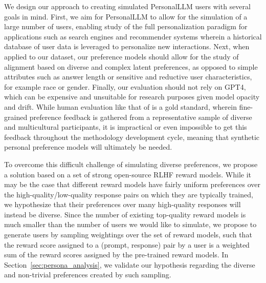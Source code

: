We design our approach to creating simulated \textsf{PersonalLLM} users with several goals in mind.
First, we aim for \textsf{PersonalLLM} to allow for the simulation of a large number of users, enabling study of the full personalization paradigm for applications such as search engines and recommender systems \citep{davidson2010youtube, das2007google, Xu_2022, F_rber_2020} wherein a historical database of user data is leveraged to personalize new interactions.
Next, when applied to our dataset, our preference models should allow for the study of alignment based on diverse and complex latent preferences, as opposed to simple attributes such as answer length or sensitive and reductive user characteristics, for example race or gender.
Finally, our evaluation should not rely on GPT4, which can be expensive and unsuitable for research purposes given model opacity and drift.
While human evaluation like that of \citet{kirk2024prismalignmentprojectparticipatory} is a gold standard, wherein 
fine-grained preference feedback is gathered from a representative sample of diverse and multicultural participants, it is impractical or even impossible to get this feedback throughout the methodology development cycle, meaning that synthetic personal preference models will ultimately be needed.


To overcome this difficult challenge of simulating diverse preferences, we propose a solution based on a set of strong open-source RLHF reward models.  
While it may be the case that different reward models have fairly uniform preferences over the high-quality/low-quality response pairs on which they are typically trained, we hypothesize that their preferences over many high-quality responses will instead be diverse.
Since the number of existing top-quality reward models is much smaller than the number of users we would like to simulate, we propose to generate users by sampling weightings over the set of reward models, such that the reward score assigned to a (prompt, response) pair by a user is a weighted sum of the reward scores assigned by the pre-trained reward models.
In Section~\ref{sec:persona_analysis}, we validate our hypothesis regarding the diverse and non-trivial preferences created by such sampling.

